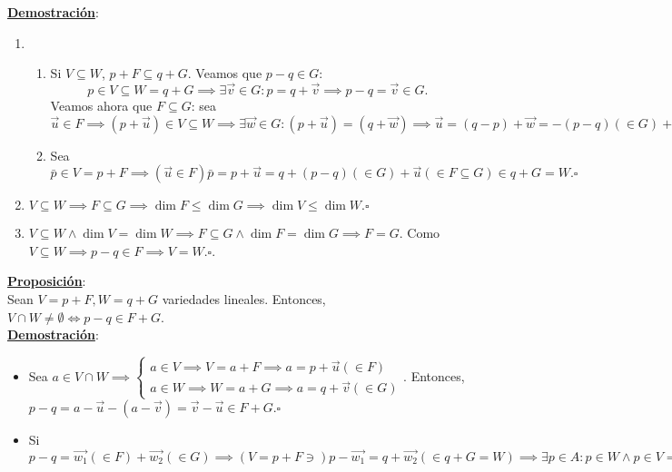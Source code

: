 \documentclass[11pt]{article}
\newcommand{\prop}{\underline{\textbf{Proposición}}:\\}
\newcommand{\dem}{\underline{\textbf{Demostración}}:\\}
\begin{document}
\dem \begin{enumerate}
	\item \begin{enumerate}
		\item[$\Rightarrow$)] Si $V\subseteq W$, $p+F\subseteq q+G$. Veamos que $p-q\in G$:
		$$p\in V\subseteq W=q+G\implies\exists\vec{v}\in G:p=q+\vec{v}\implies p-q=\vec{v}\in G.$$
		Veamos ahora que $F\subseteq G$: sea $\vec{u}\in F\implies(p+\vec{u})\in V\subseteq W\implies\exists\vec{w}\in G:(p+\vec{u})=(q+\vec{w})\implies\vec{u}=(q-p)+\vec{w}=-(p-q)(\in G)+\vec{w}(\in G)\implies\vec{u}\in G\implies F\subseteq G.$
		\item[$\Leftarrow$)] Sea $\bar{p}\in V=p+F\implies(\vec{u}\in F) \bar{p}=p+\vec{u}=q+(p-q)(\in G)+\vec{u}(\in F\subseteq G)\in q+G=W.\square$
	\end{enumerate}
	\item $V\subseteq W\implies F\subseteq G\implies\dim F\leq\dim G\implies\dim V\leq\dim W.\square$
	\item $V\subseteq W\wedge\dim V=\dim W\implies F\subseteq G\wedge\dim F=\dim G\implies F=G.$ Como $V\subseteq W\implies p-q\in F\implies V=W.\square$.
\end{enumerate}
\prop Sean $V=p+F,W=q+G$ variedades lineales. Entonces, $V\cap W\neq\emptyset\iff p-q\in F+G$.\\
\dem \begin{itemize}
	\item[$\Rightarrow$)] Sea $a\in V\cap W\implies\begin{cases} a\in V\implies V=a+F\implies a=p+\vec{u}(\in F)\\ a\in W\implies W=a+G\implies a=q+\vec{v}(\in G)\end{cases}$. Entonces, $p-q=a-\vec{u}-(a-\vec{v})=\vec{v}-\vec{u}\in F+G.\square$
	\item[$\Leftarrow$)] Si $p-q=\vec{w_1}(\in F)+\vec{w_2}(\in G)\implies (V=p+F\ni)p-\vec{w_1}=q+\vec{w_2}(\in q+G=W)\implies\exists p\in A:p\in W\wedge p\in V\implies V\cap W\neq\emptyset.\square$
\end{itemize}
\end{document}
